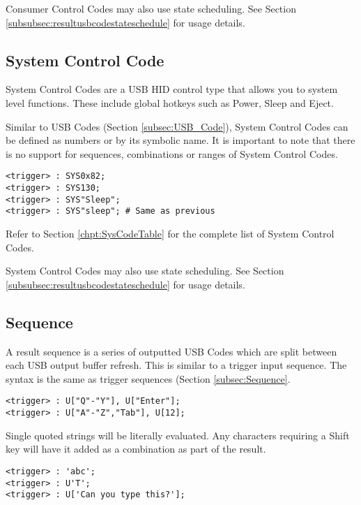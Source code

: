 \documentclass{kiibohd-template}
\begin{document}
Consumer Control Codes may also use state scheduling. See Section \ref{subsubsec:resultusbcodestateschedule} for usage details.


\subsection{System Control Code}

System Control Codes are a USB HID control type that allows you to system level functions.
These include global hotkeys such as Power, Sleep and Eject.

Similar to USB Codes (Section \ref{subsec:USB_Code}), System Control Codes can be defined as numbers or by its symbolic name.
It is important to note that there is no support for sequences, combinations or ranges of System Control Codes.

\begin{lstlisting}
<trigger> : SYS0x82;
<trigger> : SYS130;
<trigger> : SYS"Sleep";
<trigger> : SYS"sleep"; # Same as previous
\end{lstlisting}

Refer to Section \ref{chpt:SysCodeTable} for the complete list of System Control Codes.

System Control Codes may also use state scheduling. See Section \ref{subsubsec:resultusbcodestateschedule} for usage details.


\subsection{Sequence}

A result sequence is a series of outputted USB Codes which are split between each USB output buffer refresh.
This is similar to a trigger input sequence.
The syntax is the same as trigger sequences (Section \ref{subsec:Sequence}.

\begin{lstlisting}
<trigger> : U["Q"-"Y"], U["Enter"];
<trigger> : U["A"-"Z","Tab"], U[12];
\end{lstlisting}

Single quoted strings will be literally evaluated.
Any characters requiring a Shift key will have it added as a combination as part of the result.

\begin{lstlisting}
<trigger> : 'abc';
<trigger> : U'T';
<trigger> : U['Can you type this?'];
\end{lstlisting}
\end{document}
